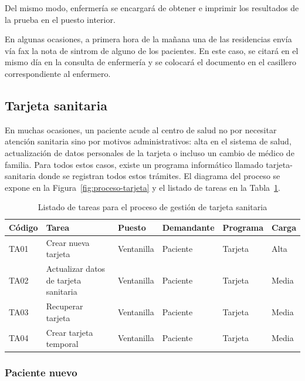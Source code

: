 Del mismo modo, enfermería se encargará de obtener e imprimir los resultados de la prueba en el puesto interior.

En algunas ocasiones, a primera hora de la mañana una de las residencias envía vía fax la nota de \Gls{sintrom} de alguno de los pacientes.
En este caso, se citará en el mismo día en la consulta de enfermería y se colocará el documento en el casillero correspondiente al enfermero.

\subsection{Tarjeta sanitaria}

En muchas ocasiones, un paciente acude al centro de salud no por necesitar atención sanitaria sino por motivos administrativos: alta en el sistema de salud, actualización de datos personales de la tarjeta o incluso un cambio de médico de familia. Para todos estos casos, existe un programa informático llamado \Gls{tarjeta-sanitaria} donde se registran todos estos trámites. El diagrama del proceso se expone en la Figura~\ref{fig:proceso-tarjeta} y el listado de tareas en la Tabla~\ref{tab:proceso-tarjeta}.

\begin{table}[H]
    \begin{tabular}{lp{5cm}llll}
        \toprule
        Código & Tarea                                 & Puesto     & Demandante & Programa & Carga \\
        \midrule
        TA01   & Crear nueva tarjeta                   & Ventanilla & Paciente   & Tarjeta  & Alta  \\
        TA02   & Actualizar datos de tarjeta sanitaria & Ventanilla & Paciente   & Tarjeta  & Media \\
        TA03   & Recuperar tarjeta                     & Ventanilla & Paciente   & Tarjeta  & Media \\
        TA04   & Crear tarjeta temporal                & Ventanilla & Paciente   & Tarjeta  & Media \\
        \bottomrule
    \end{tabular}
    \caption{Listado de tareas para el proceso de gestión de tarjeta sanitaria}
    \label{tab:proceso-tarjeta}
\end{table}

\subsubsection{Paciente nuevo}

